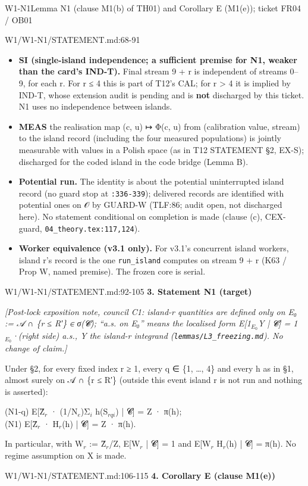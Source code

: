 \begin{card}{W1-N1}{Lemma N1 (clause M1(b) of TH01) and Corollary E (M1(e)); ticket FR04 / OB01}
\begin{stmt}{W1/W1-N1/STATEMENT.md:68-91}
\begin{itemize}
\item \textbf{SI (single-island independence; a sufficient premise for N1, weaker than the card's IND-T).} Final stream 9 + r is
  independent of streams 0–9, for each r. For r ≤ 4 this is part of T12's CAL; for r > 4 it is implied by IND-T, whose
  extension audit is pending and is \textbf{not} discharged by this ticket. N1 uses no independence between islands.
\item \textbf{MEAS} the realisation map (c, u) ↦ Φ(c, u) from (calibration value, stream) to the island record (including the four
  measured populations) is jointly measurable with values in a Polish space (as in T12 STATEMENT §2, EX-S); discharged for
  the coded island in the code bridge (Lemma B).
\item \textbf{Potential run.} The identity is about the potential uninterrupted island record (no guard stop at \texttt{:336-339});
  delivered records are identified with potential ones on 𝒪 by GUARD-W (TLF:86; audit open, not discharged here). No
  statement conditional on completion is made (clause (c), CEX-guard, \texttt{04\_theory.tex:117,124}).
\item \textbf{Worker equivalence (v3.1 only).} For v3.1's concurrent island workers, island r's record is the one \texttt{run\_island}
  computes on stream 9 + r (K63 / Prop W, named premise). The frozen core is serial.
\end{itemize}
\end{stmt}
\begin{stmt}{W1/W1-N1/STATEMENT.md:92-105}
\textbf{3. Statement N1 (target)}

\emph{[Post-lock exposition note, council C1: island-r quantities are defined only on E₀ := 𝒜 ∩ \{r ≤ R′\} ∈ σ(𝓒);
``a.s. on E₀'' means the localised form E[1$_{E_{0}}$Y | 𝓒] = 1$_{E_{0}}$·(right side) a.s., Y the island-r integrand
(\texttt{lemmas/L3\_freezing.md}). No change of claim.]}

Under §2, for every fixed index r ≥ 1, every q ∈ \{1, …, 4\} and every h as in §1, almost surely on 𝒜 ∩ \{r ≤ R′\}
(outside this event island r is not run and nothing is asserted):

\medskip
\noindent (N1-q) E[Ẑ$_{r}$ · (1/N$_{e}$)Σ$_{i}$ h(S$_{rqi}$) | 𝓒] = Z · π(h);\\
\noindent (N1) E[Ẑ$_{r}$ · H$_{r}$(h) | 𝓒] = Z · π(h).
\medskip

In particular, with W$_{r}$ := Ẑ$_{r}$/Z, E[W$_{r}$ | 𝓒] = 1 and E[W$_{r}$ H$_{r}$(h) | 𝓒] = π(h). No regime assumption on X is made.
\end{stmt}
\begin{stmt}{W1/W1-N1/STATEMENT.md:106-115}
\textbf{4. Corollary E (clause M1(e))}


\end{stmt}
\end{card}
